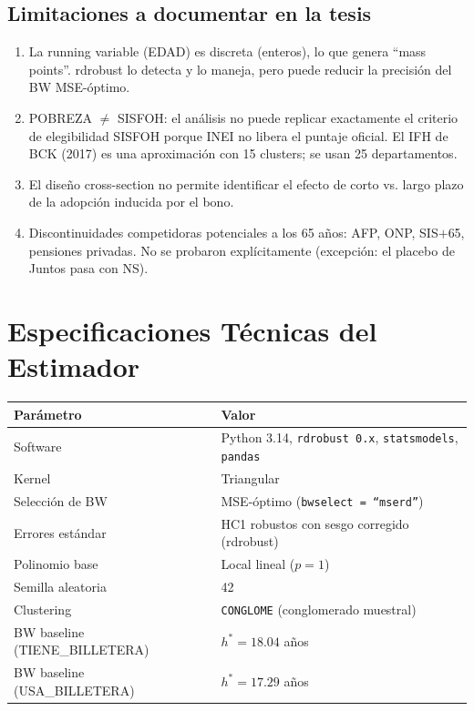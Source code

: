 \documentclass[12pt, a4paper]{article}
\begin{document}
\subsection{Limitaciones a documentar en la tesis}

\begin{enumerate}[noitemsep]
  \item La running variable (EDAD) es discreta (enteros), lo que genera
    ``mass points''. rdrobust lo detecta y lo maneja, pero puede reducir
    la precisión del BW MSE-óptimo.
  \item POBREZA $\neq$ SISFOH: el análisis no puede replicar exactamente el
    criterio de elegibilidad SISFOH porque INEI no libera el puntaje oficial.
    El IFH de BCK (2017) es una aproximación con 15 clusters; se usan
    25 departamentos.
  \item El diseño cross-section no permite identificar el efecto de corto
    vs. largo plazo de la adopción inducida por el bono.
  \item Discontinuidades competidoras potenciales a los 65 años: AFP, ONP,
    SIS$+$65, pensiones privadas. No se probaron explícitamente (excepción:
    el placebo de Juntos pasa con NS).
\end{enumerate}

\section{Especificaciones Técnicas del Estimador}

\begin{center}
\begin{tabular}{ll}
\toprule
Parámetro & Valor \\\midrule
Software & Python 3.14, \texttt{rdrobust 0.x}, \texttt{statsmodels}, \texttt{pandas} \\
Kernel & Triangular \\
Selección de BW & MSE-óptimo (\texttt{bwselect = ``mserd''}) \\
Errores estándar & HC1 robustos con sesgo corregido (rdrobust) \\
Polinomio base & Local lineal ($p=1$) \\
Semilla aleatoria & 42 \\
Clustering & \texttt{CONGLOME} (conglomerado muestral) \\
BW baseline (TIENE\_BILLETERA) & $h^* = 18.04$ años \\
BW baseline (USA\_BILLETERA) & $h^* = 17.29$ años \\
\bottomrule
\end{tabular}
\end{center}
\end{document}
